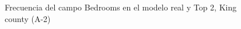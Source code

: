 \begin{figure}[H]
    \centering
    
    \caption{Frecuencia del campo Bedrooms en el modelo real y Top 2, King county (A-2)}
    \label{frecuency-top2-bedrooms}
\end{figure}